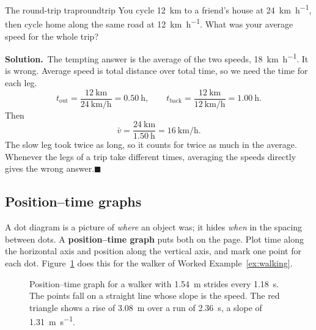 \documentclass[11pt,twoside,openany]{book}
\newcommand{\solution}{\par\smallskip\noindent\textbf{Solution.}\ }
\newcommand{\qed}{\hfill$\blacksquare$}
\begin{document}
\begin{example}{The round-trip trap}{roundtrip}
You cycle \SI{12}{\kilo\metre} to a friend's house at \SI{24}{\kilo\metre\per\hour}, then cycle home along the same road at \SI{12}{\kilo\metre\per\hour}. What was your average speed for the whole trip?

\solution The tempting answer is the average of the two speeds, \SI{18}{\kilo\metre\per\hour}. It is wrong. Average speed is total distance over total time, so we need the time for each leg.
\[
t_{\text{out}} = \frac{\SI{12}{\kilo\metre}}{\SI{24}{\kilo\metre\per\hour}} = \SI{0.50}{\hour},
\qquad
t_{\text{back}} = \frac{\SI{12}{\kilo\metre}}{\SI{12}{\kilo\metre\per\hour}} = \SI{1.00}{\hour}.
\]
Then
\[
\bar v = \frac{\SI{24}{\kilo\metre}}{\SI{1.50}{\hour}} = \SI{16}{\kilo\metre\per\hour}.
\]
The slow leg took twice as long, so it counts for twice as much in the average. Whenever the legs of a trip take different times, averaging the speeds directly gives the wrong answer.\qed
\end{example}

\subsection{Position--time graphs}

A dot diagram is a picture of \emph{where} an object was; it hides \emph{when} in the spacing between dots. A \textbf{position--time graph} puts both on the page. Plot time along the horizontal axis and position along the vertical axis, and mark one point for each dot. Figure~\ref{fig:xt} does this for the walker of Worked Example~\ref{ex:walking}.

\begin{figure}[htb]
\centering
{}
\caption{Position--time graph for a walker with \SI{1.54}{\metre} strides every \SI{1.18}{\second}. The points fall on a straight line whose slope is the speed. The red triangle shows a rise of \SI{3.08}{\metre} over a run of \SI{2.36}{\second}, a slope of \SI{1.31}{\metre\per\second}.}
\label{fig:xt}
\end{figure}
\end{document}
